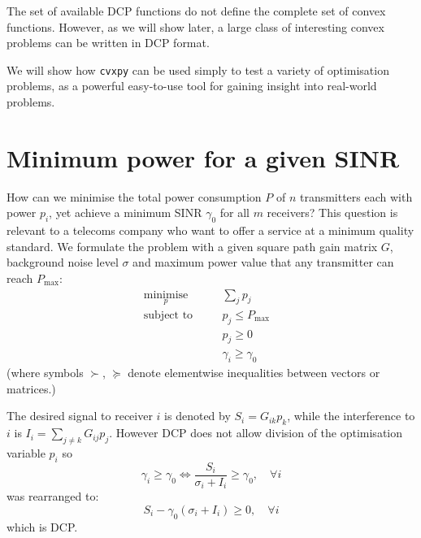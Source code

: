 \documentclass[twocolumn,secnumarabic,amssymb, nobibnotes, aps, prl,superscriptaddress]{revtex4-1}
\begin{document}
The set of available DCP functions do not define the complete set of convex functions. However, as we will show later, a large class of interesting convex problems can be written in DCP format.

We will show how \texttt{cvxpy} can be used simply to test a variety of optimisation problems, as a powerful easy-to-use tool for gaining insight into real-world problems.

\section{Minimum power for a given SINR}
How can we minimise the total power consumption $P$ of $n$ transmitters each with power $p_i$, yet achieve a minimum SINR $\gamma_0$ for all $m$ receivers? This question is relevant to a telecoms company who want to offer a service at a minimum quality standard. We formulate the problem with a given square path gain matrix $G$, background noise level $\sigma$ and maximum power value that any transmitter can reach $P_{\text{max}}$:
		\begin{align*}
				&\underset{p}{\text{minimise}} \quad &&\sum_j p_j\\
				&\text{subject to} \quad &&p_j \leq P_{\max}\\
				& \quad &&p_j \geq 0\\
				& \quad &&\gamma_i \geq \gamma_0&&
		\end{align*}
(where symbols $\succ$, $\succeq$ denote elementwise inequalities between vectors or matrices.)

The desired signal to receiver $i$ is denoted by $S_i = G_{ik}p_k$, while the interference to $i$ is $I_i = \sum_{j\neq k}G_{ij}p_j$. However DCP does not allow division of the optimisation variable $p_i$ so  
\begin{equation*}
  \gamma_i \geq \gamma_0\Longleftrightarrow  \frac{S_i}{\sigma_i + I_i}\geq \gamma_0, \quad \forall i
\end{equation*}
was rearranged to:
\begin{equation*}
S_i-\gamma_0(\sigma_i + I_i)\geq 0, \quad \forall i
\end{equation*} which is DCP.
\end{document}
